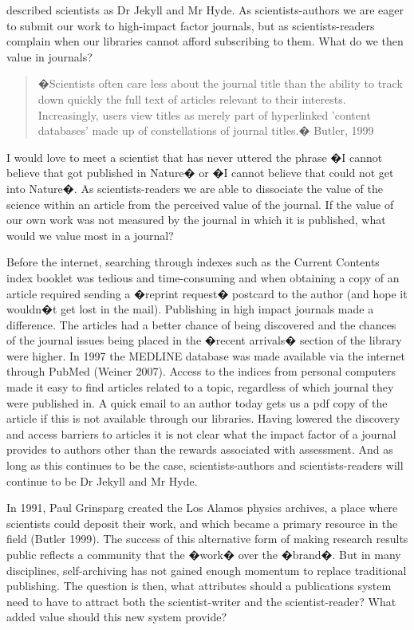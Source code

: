 \documentclass[final,authoryear,3p]{elsarticle-open-drafting}
\begin{document}
\citet{guedon2001ols} described scientists as Dr Jekyll and Mr Hyde. As scientists-authors we are eager to submit our work to high-impact factor journals, but as scientists-readers complain when our libraries cannot afford subscribing to them. What do we then value in journals?

\begin{quote}
�Scientists often care less about the journal title than the ability to track down quickly the full text of articles relevant to their interests. Increasingly, users view titles as merely part of hyperlinked 'content databases' made up of constellations of journal titles.� Butler, 1999
\end{quote}

I would love to meet a scientist that has never uttered the phrase �I cannot believe that got published in Nature� or �I cannot believe that could not get into Nature�. 
As scientists-readers we are able to dissociate the value of the science within an article from the perceived value of the journal. If the value of our own work was not measured by the journal in which it is published, what would we value most in a journal?

Before the internet, searching through indexes such as the Current Contents index booklet was tedious and time-consuming and 
when obtaining a copy of an article required sending a �reprint request� postcard to the author (and hope it wouldn�t get lost in the 
mail). Publishing in high impact journals made a difference. The articles had a better chance of being discovered and the 
chances of the journal issues being placed in the �recent arrivals� section of the library were higher. In 1997 the MEDLINE 
database was made available via the internet through PubMed (Weiner 2007). Access to the indices from personal computers 
made it easy to find articles related to a topic, regardless of which journal they were published in. A quick email to an author 
today gets us a pdf copy of the article if this is not available through our libraries. Having lowered the discovery and access 
barriers to articles it is not clear what the impact factor of a journal provides to authors other than the rewards associated with 
assessment. And as long as this continues to be the case, scientists-authors and scientists-readers will continue to be Dr Jekyll 
and Mr Hyde.

In 1991, Paul Grinsparg created the Los Alamos physics archives, a place where scientists could deposit their work, and which 
became a primary resource in the field (Butler 1999). The success of this alternative form of making research results public  
reflects a community that the �work� over the �brand�. But in many disciplines, self-archiving has not gained enough momentum to 
replace traditional publishing. The question is then, what attributes should a publications system need to have to attract both the 
scientist-writer and the scientist-reader? What added value should this new system provide?
\end{document}
